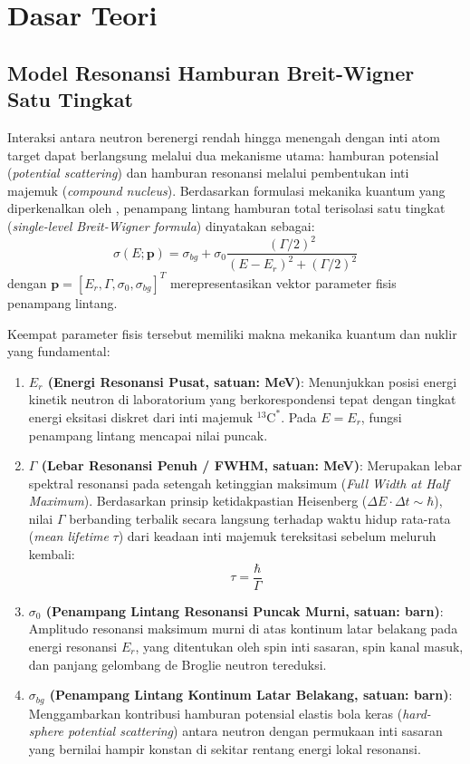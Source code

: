 \section{Dasar Teori}

\subsection*{Model Resonansi Hamburan Breit-Wigner Satu Tingkat}
Interaksi antara neutron berenergi rendah hingga menengah dengan inti atom target dapat berlangsung melalui dua mekanisme utama: hamburan potensial (\textit{potential scattering}) dan hamburan resonansi melalui pembentukan inti majemuk (\textit{compound nucleus}). Berdasarkan formulasi mekanika kuantum yang diperkenalkan oleh \textcite{breit1936capture}, penampang lintang hamburan total terisolasi satu tingkat (\textit{single-level Breit-Wigner formula}) dinyatakan sebagai:
\begin{equation}
    \sigma(E; \mathbf{p}) = \sigma_{bg} + \sigma_0 \frac{(\Gamma / 2)^2}{(E - E_r)^2 + (\Gamma / 2)^2}
    \label{eq:breit_wigner}
\end{equation}
dengan $\mathbf{p} = [E_r, \Gamma, \sigma_0, \sigma_{bg}]^T$ merepresentasikan vektor parameter fisis penampang lintang.

Keempat parameter fisis tersebut memiliki makna mekanika kuantum dan nuklir yang fundamental:
\begin{enumerate}
    \item \textbf{$E_r$ (Energi Resonansi Pusat, satuan: MeV)}: Menunjukkan posisi energi kinetik neutron di laboratorium yang berkorespondensi tepat dengan tingkat energi eksitasi diskret dari inti majemuk $^{13}\text{C}^*$. Pada $E = E_r$, fungsi penampang lintang mencapai nilai puncak.
    \item \textbf{$\Gamma$ (Lebar Resonansi Penuh / FWHM, satuan: MeV)}: Merupakan lebar spektral resonansi pada setengah ketinggian maksimum (\textit{Full Width at Half Maximum}). Berdasarkan prinsip ketidakpastian Heisenberg ($\Delta E \cdot \Delta t \sim \hbar$), nilai $\Gamma$ berbanding terbalik secara langsung terhadap waktu hidup rata-rata (\textit{mean lifetime} $\tau$) dari keadaan inti majemuk tereksitasi sebelum meluruh kembali:
    \begin{equation}
        \tau = \frac{\hbar}{\Gamma}
        \label{eq:heisenberg_lifetime}
    \end{equation}
    \item \textbf{$\sigma_0$ (Penampang Lintang Resonansi Puncak Murni, satuan: barn)}: Amplitudo resonansi maksimum murni di atas kontinum latar belakang pada energi resonansi $E_r$, yang ditentukan oleh spin inti sasaran, spin kanal masuk, dan panjang gelombang de Broglie neutron tereduksi.
    \item \textbf{$\sigma_{bg}$ (Penampang Lintang Kontinum Latar Belakang, satuan: barn)}: Menggambarkan kontribusi hamburan potensial elastis bola keras (\textit{hard-sphere potential scattering}) antara neutron dengan permukaan inti sasaran yang bernilai hampir konstan di sekitar rentang energi lokal resonansi.
\end{enumerate}

